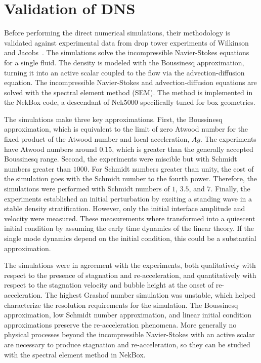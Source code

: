 \section{Validation of DNS}
Before performing the direct numerical simulations, their methodology is validated against experimental data from drop tower experiments of Wilkinson and Jacobs~\cite{Wilkinson2007}.
The simulations solve the incompressible Navier-Stokes equations for a single fluid.
The density is modeled with the Boussinesq approximation, turning it into an active scalar coupled to the flow via the advection-diffusion equation.
The incompressible Navier-Stokes and advection-diffusion equations are solved with the spectral element method (SEM).
The method is implemented in the NekBox code, a descendant of Nek5000 specifically tuned for box geometries.

The simulations make three key approximations.
First, the Boussinesq approximation, which is equivalent to the limit of zero Atwood number for the fixed product of the Atwood number and local acceleration, $Ag$.
The experiments have Atwood numbers around $0.15$, which is greater than the generally accepted Boussinesq range.
Second, the experiments were miscible but with Schmidt numbers greater than $1000$.
For Schmidt numbers greater than unity, the cost of the simulation goes with the Schmidt number to the fourth power.
Therefore, the simulations were performed with Schmidt numbers of $1$, $3.5$, and $7$.
Finally, the experiments established an initial perturbation by exciting a standing wave in a stable density stratification.
However, only the initial interface amplitude and velocity were measured.
These measurements where transformed into a quiescent initial condition by assuming the early time dynamics of the linear theory.
If the single mode dynamics depend on the initial condition, this could be a substantial approximation.

The simulations were in agreement with the experiments, both qualitatively with respect to the presence of stagnation and re-acceleration, and quantitatively with respect to the stagnation velocity and bubble height at the onset of re-acceleration.
The highest Grashof number simulation was unstable, which helped characterize the resolution requirements for the simulation.
The Boussinesq approximation, low Schmidt number approximation, and linear initial condition approximations preserve the re-acceleration phenomena.
More generally no physical processes beyond the incompressible Navier-Stokes with an active scalar are necessary to produce stagnation and re-acceleration, so they can be studied with the spectral element method in NekBox.

